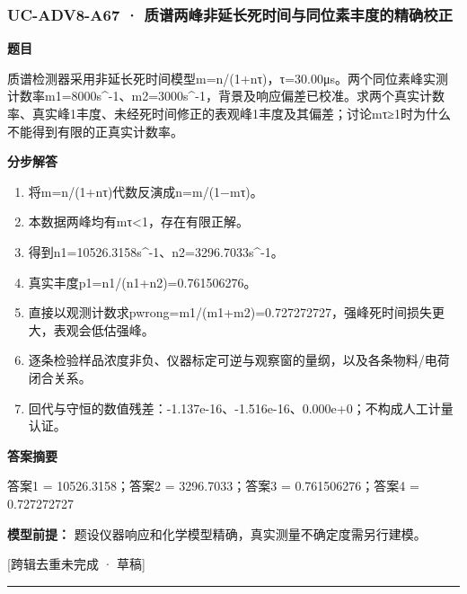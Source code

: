 \documentclass[UTF8,11pt,a4paper]{ctexart}
\begin{document}
\subsubsection*{UC-ADV8-A67 · 质谱两峰非延长死时间与同位素丰度的精确校正}
\noindent\textbf{题目}\par
质谱检测器采用非延长死时间模型m=n/(1+nτ)，τ=30.00μs。两个同位素峰实测计数率m1=8000s\textasciicircum{}-1、m2=3000s\textasciicircum{}-1，背景及响应偏差已校准。求两个真实计数率、真实峰1丰度、未经死时间修正的表观峰1丰度及其偏差；讨论mτ≥1时为什么不能得到有限的正真实计数率。\par
\medskip\noindent\textbf{分步解答}
\begin{enumerate}
\item 将m=n/(1+nτ)代数反演成n=m/(1−mτ)。
\item 本数据两峰均有mτ<1，存在有限正解。
\item 得到n1=10526.3158s\textasciicircum{}-1、n2=3296.7033s\textasciicircum{}-1。
\item 真实丰度p1=n1/(n1+n2)=0.761506276。
\item 直接以观测计数求pwrong=m1/(m1+m2)=0.727272727，强峰死时间损失更大，表观会低估强峰。
\item 逐条检验样品浓度非负、仪器标定可逆与观察窗的量纲，以及各条物料/电荷闭合关系。
\item 回代与守恒的数值残差：-1.137e-16、-1.516e-16、0.000e+0；不构成人工计量认证。
\end{enumerate}
\noindent\textbf{答案摘要}\par
答案1 = 10526.3158；答案2 = 3296.7033；答案3 = 0.761506276；答案4 = 0.727272727\par
\noindent\textbf{模型前提：}
题设仪器响应和化学模型精确，真实测量不确定度需另行建模。\par
\noindent\textcolor{red!65!black}{[跨辑去重未完成 · 草稿]} \par
\medskip\hrule\medskip
{}
\end{document}
